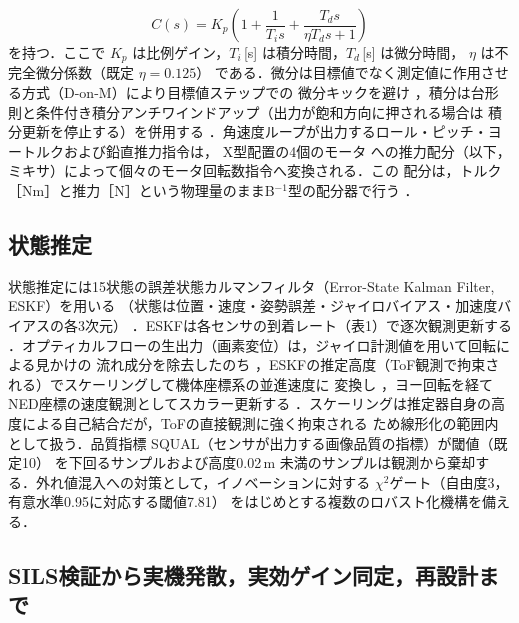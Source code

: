 \documentclass[a4paper,twocolumn,10pt]{ltjsarticle}
\begin{document}
\[
C(s)=K_p\left(1+\frac{1}{T_i s}+\frac{T_d s}{\eta T_d s+1}\right)
\]
を持つ．ここで $K_p$ は比例ゲイン，$T_i$\,[s] は積分時間，$T_d$\,[s] は微分時間，
$\eta$ は不完全微分係数（既定 $\eta=0.125$）%
である．微分は目標値でなく測定値に作用させる方式（D-on-M）により目標値ステップでの
微分キックを避け%
，積分は台形則と条件付き積分アンチワインドアップ（出力が飽和方向に押される場合は
積分更新を停止する）を併用する%
．角速度ループが出力するロール・ピッチ・ヨートルクおよび鉛直推力指令は，
X型配置の4個のモータ%
への推力配分（以下，ミキサ）によって個々のモータ回転数指令へ変換される．この
配分は，トルク［Nm］と推力［N］という物理量のままB$^{-1}$型の配分器で行う
．

\subsection{状態推定}

状態推定には15状態の誤差状態カルマンフィルタ（Error-State Kalman Filter, ESKF）を用いる
（状態は位置・速度・姿勢誤差・ジャイロバイアス・加速度バイアスの各3次元）%
．ESKFは各センサの到着レート（表1）で逐次観測更新する%
．オプティカルフローの生出力（画素変位）は，ジャイロ計測値を用いて回転による見かけの
流れ成分を除去したのち%
，ESKFの推定高度（ToF観測で拘束される）でスケーリングして機体座標系の並進速度に
変換し%
，ヨー回転を経てNED座標の速度観測としてスカラー更新する%
．スケーリングは推定器自身の高度による自己結合だが，ToFの直接観測に強く拘束される
ため線形化の範囲内として扱う．品質指標
SQUAL（センサが出力する画像品質の指標）が閾値（既定10）%
を下回るサンプルおよび高度0.02\,m%
未満のサンプルは観測から棄却する．外れ値混入への対策として，イノベーションに対する
$\chi^2$ゲート（自由度3，有意水準0.95に対応する閾値7.81）%
をはじめとする複数のロバスト化機構を備える．

\subsection{SILS検証から実機発散，実効ゲイン同定，再設計まで}
\end{document}
